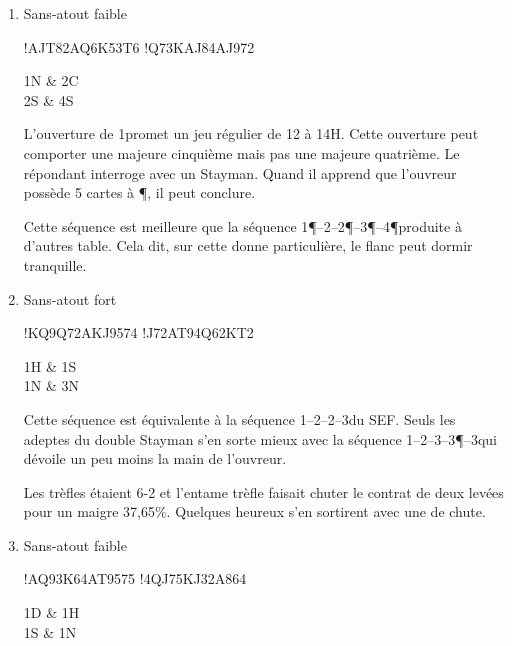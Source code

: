 {\begin{enumerate}
Au box-office, 4 vaut 40.59\%. Si la défense s'avise de donner une levée, la note monte à 68,82\%. Faire chuter 3 \P ne demande pas un gros effort et rapporte 84,12\%.

Sur ouverture de 1\C et une intervention à 2\P, beaucoup de joueurs en Est se sont sentis des ailes et ont préférés l'enchère forcing de 3\K au contre d'appel. Après cela, la catastrophe était inévitable. Sur une ouverture de 2\C, limitée à 14H, il est plus facile pour Est de juger correctement sa main.

\item  Sans-atout faible

\hand!{AJT82}{AQ6}{K53}{T6} \quad \hand!{Q73}{K}{AJ84}{AJ972} \quad
\begin{biddingpair}
 1N & 2C\\
 2S & 4S\\
\end{biddingpair}

L'ouverture de 1\NT promet un jeu régulier de 12 à 14H. Cette ouverture peut comporter une majeure cinquième mais pas une majeure quatrième.
Le répondant interroge avec un Stayman. Quand il apprend que l'ouvreur possède 5 cartes à \P, il peut conclure.

Cette séquence est meilleure que la séquence 1\P--2\T--2\P--3\P--4\P produite à d'autres table. Cela dit, sur cette donne particulière, le flanc peut dormir tranquille.

\item Sans-atout fort

\hand!{KQ9}{Q72}{AKJ95}{74} \quad \hand!{J72}{AT94}{Q62}{KT2} \quad
\begin{biddingpair}
 1H & 1S \\
 1N & 3N\\
\end{biddingpair}

Cette séquence est équivalente à la séquence 1\NT--2\T--2\K--3\NT du SEF. Seuls les adeptes du double Stayman s'en sorte mieux avec la séquence
1\NT--2\NT--3\T--3\P--3\NT qui dévoile un peu moins la main de l'ouvreur.

Les trèfles étaient 6-2 et l'entame trèfle faisait chuter le contrat de deux levées pour un maigre 37,65\%. Quelques heureux s'en sortirent avec une de chute.

\item Sans-atout faible

\hand!{AQ93}{K64}{AT95}{75} \quad \hand!{4}{QJ75}{KJ32}{A864}\quad
\begin{biddingpair}
 1D & 1H \\
 1S & 1N \\
\end{biddingpair}


\end{enumerate}}
